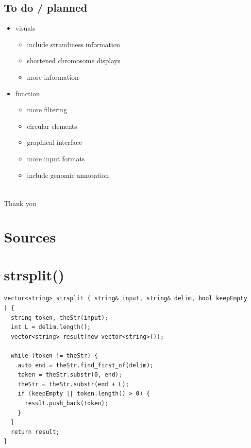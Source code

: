 \documentclass[presentation]{beamer}
\begin{document}
\subsection*{To do / planned}
\label{sec-4-2}

\begin{itemize}
\item visuals
\begin{itemize}
\item include strandiness information
\item shortened chromosome displays
\item more information
\end{itemize}
\item function
\begin{itemize}
\item more filtering
\item circular elements
\item graphical interface
\item more input formats
\item include genomic annotation
\end{itemize}
\end{itemize}

\section*{}
\label{sec-5}
\alert{Thank you}

\section*{Sources}
\label{sec-6}

\section*{strsplit()}
\label{sec-7}

\begin{verbatim}
vector<string> strsplit ( string& input, string& delim, bool keepEmpty ) {
  string token, theStr(input);
  int L = delim.length();
  vector<string> result(new vector<string>());

  while (token != theStr) {
    auto end = theStr.find_first_of(delim);
    token = theStr.substr(0, end);
    theStr = theStr.substr(end + L);
    if (keepEmpty || token.length() > 0) {
      result.push_back(token);
    }
  }
  return result;
}
\end{verbatim}
\end{document}
